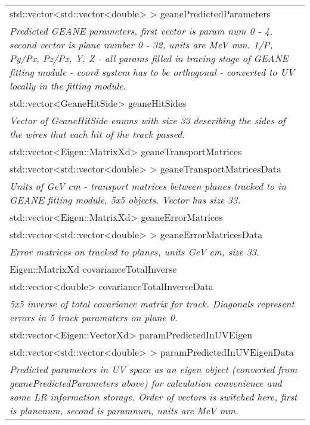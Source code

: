 \begin{longtable}{|p{16cm}|}
std::vector\textless{}std::vector\textless{}double\textgreater{} \textgreater{} geanePredictedParameters \\ 
\textit{Predicted GEANE parameters, first vector is param num 0 - 4, second vector is plane number 0 - 32, units are MeV mm. 1/P, Py/Px, Pz/Px, Y, Z - all params filled in tracing stage of GEANE fitting module - coord system has to be orthogonal - converted to UV locally in the fitting module.} \\ \hline

std::vector\textless{}GeaneHitSide\textgreater{} geaneHitSides \\
\textit{Vector of GeaneHitSide enums with size 33 describing the sides of the wires that each hit of the track passed.} \\ \hline
 

std::vector\textless{}Eigen::MatrixXd\textgreater{} geaneTransportMatrices \\
std::vector\textless{}std::vector\textless{}double\textgreater{} \textgreater{} geaneTransportMatricesData \\ 
\textit{Units of GeV cm - transport matrices between planes tracked to in GEANE fitting module, 5x5 objects. Vector has size 33.} \\ \hline

std::vector\textless{}Eigen::MatrixXd\textgreater{} geaneErrorMatrices \\ 
std::vector\textless{}std::vector\textless{}double\textgreater{} \textgreater{} geaneErrorMatricesData \\ 
\textit{Error matrices on tracked to planes, units GeV cm, size 33.} \\ \hline

Eigen::MatrixXd covarianceTotalInverse \\
std::vector\textless{}double\textgreater{} covarianceTotalInverseData \\
\textit{5x5 inverse of total covariance matrix for track. Diagonals represent errors in 5 track paramaters on plane 0.} \\ \hline

std::vector\textless{}Eigen::VectorXd\textgreater{} paramPredictedInUVEigen \\ 
std::vector\textless{}std::vector\textless{}double\textgreater{} \textgreater{} paramPredictedInUVEigenData \\ 
\textit{Predicted parameters in UV space as an eigen object (converted from geanePredictedParameters above) for calculation convenience and some LR information storage. Order of vectors is switched here, first is planenum, second is paramnum, units are MeV mm.} \\ \hline


\end{longtable}
